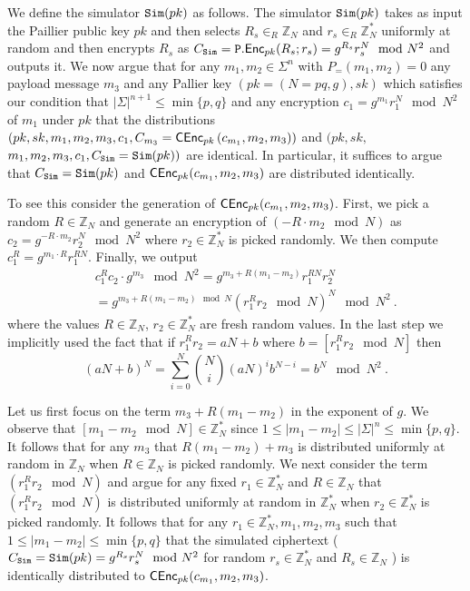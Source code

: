\begin{remindertheorem}{}  
\ThmEqTestSecrecy
\end{remindertheorem}
\begin{proofof}{}
We define the simulator $ {\mathtt{Sim}}(pk) $ as follows. The simulator $ {\mathtt{Sim}}(pk) $ takes as input the Paillier public key $ pk $ and then selects $ R_s\in_R \mathbb{Z}_{N} $ and $r_s\in_R \mathbb{Z}^*_N$ uniformly at random and then encrypts $ R_s $ as $ C_{{\mathtt{Sim}}} = {\mathtt{P}}.{\mathsf{Enc}}_{pk}(R_s; r_s) = g^{R_s} r_s^{N} \mod N^2$ and outputs it. We now argue that for any $m_1, m_2 \in \Sigma^{n}$ with $P_{=}(m_1,m_2) = 0$ any payload message $m_3$ and any Pallier key $\left(pk=\left(N=pq,g\right),sk\right)$  which satisfies our condition that $|\Sigma|^{n+1} \leq \min\{p,q\}$ and any encryption $c_1 = g^{m_1} r_1^{N} \mod{N^2}$ of $m_1$ under $pk$ that the distributions $ \left(pk, sk, m_1, m_2, m_3, c_1, C_{m_3} = {\mathsf{C}}{\mathsf{Enc}}_{pk}\left(c_{m_1}, m_2, m_3\right) \right)$ and $ (pk, sk,$ $ m_1, m_2, m_3,c_1, C_{{\mathtt{Sim}}}= {\mathtt{Sim}}(pk)) $ are identical. In particular, it suffices to argue that $C_{{\mathtt{Sim}}}= {\mathtt{Sim}}(pk)$ and ${\mathsf{C}}{\mathsf{Enc}}_{pk}(c_{m_1}, m_2, m_3)$ are distributed identically. 

To see this consider the generation of ${\mathsf{C}}{\mathsf{Enc}}_{pk}(c_{m_1}, m_2, m_3)$. First, we pick a random $R \in \mathbb{Z}_N$ and generate an encryption of $(-R \cdot m_2 \mod N)$ as $c_2 = g^{-R \cdot m_2} r_2^N \mod{N^2}$ where $r_2 \in \mathbb{Z}_N^*$ is picked randomly. We then compute $c_1^R = g^{m_1 \cdot R} r_1^{RN}$. Finally, we output
\begin{eqnarray*}&&c_1^Rc_2 \cdot g^{m_3} \mod{N^2} =  g^{m_3+R(m_1-m_2)} r_1^{RN} r_2^N \\ 
&&= g^{m_3+R(m_1-m_2) \mod N} \left(r_1^Rr_2 \mod{N}\right)^{N} \mod{N^2} \ . \end{eqnarray*}
where the values $R \in \mathbb{Z}_N$, $r_2 \in \mathbb{Z}_N^*$ are fresh random values. In the last step we implicitly used the fact that if $r_1^Rr_2 = aN+b$ where $b = \left[r_1^Rr_2 \mod{N}\right]$ then \[ (aN+b)^N = \sum_{i=0}^N {N \choose i} (aN)^ib^{N-i} = b^{N} \mod{N^2} \ . \]

Let us first focus on the term $m_3+R(m_1-m_2)$ in the exponent of $g$. We observe that $[m_1-m_2 \mod N] \in \mathbb{Z}_N^*$ since $1 \leq |m_1-m_2| \leq \left| \Sigma\right|^{n} \leq \min\{p,q\}$. It follows that for any $m_3$ that $R(m_1-m_2) + m_3$ is distributed uniformly at random in $\mathbb{Z}_N$ when $R \in \mathbb{Z}_N$ is picked randomly. We next consider the term $\left(r_1^Rr_2 \mod{N}\right)$ and argue for any fixed $r_1 \in \mathbb{Z}_N^*$ and $R \in \mathbb{Z}_N$ that $\left(r_1^Rr_2 \mod{N}\right)$ is distributed uniformly at random in $\mathbb{Z}_N^*$ when $r_2 \in \mathbb{Z}_N^*$ is picked randomly. It follows that for any $r_1 \in \mathbb{Z}_N^*, m_1,m_2,m_3$ such that $1 \leq |m_1-m_2| \leq \min\{p,q\}$ that the simulated ciphertext ($C_{{\mathtt{Sim}}}= {\mathtt{Sim}}(pk) = g^{R_s} r_s^N \mod{N^2}$ for random $r_s \in \mathbb{Z}_N^*$ and $R_s \in \mathbb{Z}_N$ ) is identically distributed to ${\mathsf{C}}{\mathsf{Enc}}_{pk}(c_{m_1}, m_2, m_3)$.
\end{proofof}



